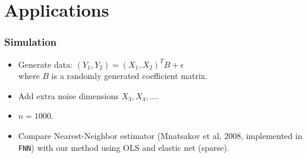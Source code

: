 \documentclass{beamer}
\newcommand{\bX}{\boldsymbol{X}}
\newcommand{\bY}{\boldsymbol{Y}}
\begin{document}








\section{Applications}

\begin{frame}
\sectionpage
\end{frame}

\begin{frame}
\frametitle{Simulation}

\begin{itemize}
\item Generate data: $(Y_1, Y_2) = (X_1, X_2)^T B + \epsilon$\\ where $B$ is a randomly generated coefficient matrix.
\item Add extra noise dimensions $X_3, X_4, \hdots$.
\item $n = 1000$.
\item Compare Nearest-Neighbor estimator (Mnatsakov et al, 2008, implemented in {\tt FNN}) with our method using OLS and elastic net (sparse).
\end{itemize}

\end{frame}
\end{document}
